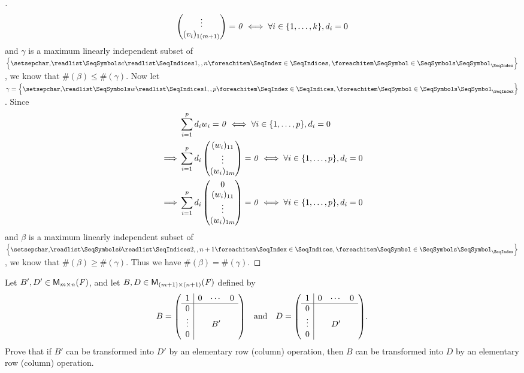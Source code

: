 \begin{proof}[]
\begin{align*}
\begin{pmatrix}
			                              \vdots      \\
			                              (v_i)_{1 (m + 1)}
		                              \end{pmatrix} = \zv \iff \forall i \in \set{1, \dots, k}, d_i = 0
	\end{align*}
	and \(\gamma\) is a maximum linearly independent subset of \(\set{\seq{c}{1,,n}}\), we know that \(\#(\beta) \leq \#(\gamma)\).
	Now let \(\gamma = \set{\seq{w}{1,,p}}\).
	Since
	\begin{align*}
		         & \sum_{i = 1}^p d_i w_i = \zv \iff \forall i \in \set{1, \dots, p}, d_i = 0           \\
		\implies & \sum_{i = 1}^p d_i \begin{pmatrix}
			                              (w_i)_{1 1} \\
			                              \vdots      \\
			                              (w_i)_{1 m}
		                              \end{pmatrix} = \zv \iff \forall i \in \set{1, \dots, p}, d_i = 0 \\
		\implies & \sum_{i = 1}^p d_i \begin{pmatrix}
			                              0           \\
			                              (w_i)_{1 1} \\
			                              \vdots      \\
			                              (w_i)_{1 m}
		                              \end{pmatrix} = \zv \iff \forall i \in \set{1, \dots, p}, d_i = 0 \\
	\end{align*}
	and \(\beta\) is a maximum linearly independent subset of \(\set{\seq{b}{2,,n+1}}\), we know that \(\#(\beta) \geq \#(\gamma)\).
	Thus we have \(\#(\beta) = \#(\gamma)\).
\end{proof}

\begin{ex}\label{ex:3.2.12}
	Let \(B', D' \in \MS\), and let \(B, D \in \ms[(m + 1)][(n + 1)][\F]\) defined by
	\[
		B = \pa{\begin{array}{c|ccc}
				1      & 0 & \cdots & 0 \\
				\hline
				0      &   &        &   \\
				\vdots &   & B'     &   \\
				0      &   &        &
			\end{array}} \quad \text{and} \quad D = \pa{\begin{array}{c|ccc}
				1      & 0 & \cdots & 0 \\
				\hline
				0      &   &        &   \\
				\vdots &   & D'     &   \\
				0      &   &        &
			\end{array}}.
	\]
	Prove that if \(B'\) can be transformed into \(D'\) by an elementary row (column) operation, then \(B\) can be transformed into \(D\) by an elementary row (column) operation.
\end{ex}


